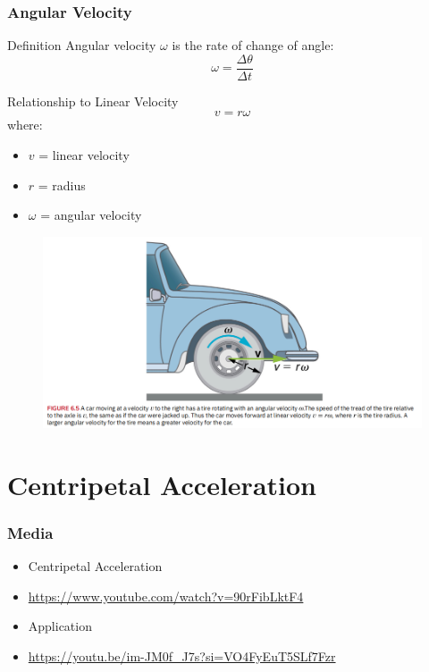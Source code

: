 \documentclass{beamer}
\begin{document}
\begin{frame}
\frametitle{Angular Velocity}
\begin{block}{Definition}
Angular velocity $\omega$ is the rate of change of angle:
\[ \omega = \frac{\Delta\theta}{\Delta t} \]
\end{block}
\begin{block}{Relationship to Linear Velocity}
\[ v = r\omega \]
where:
\begin{itemize}
\item $v$ = linear velocity
\item $r$ = radius
\item $\omega$ = angular velocity
\end{itemize}
\end{block}
\end{frame}

\begin{frame}
\begin{figure}
    \centering
    \includegraphics[width=1\linewidth]{CH6/wheelomega.png}
\end{figure}
\end{frame}

\section{Centripetal Acceleration}

\begin{frame}
\frametitle{Media}
     \begin{itemize}
  \item Centripetal Acceleration
  \item \hyperlink{https://www.youtube.com/watch?v=90rFibLktF4}{https://www.youtube.com/watch?v=90rFibLktF4}
  \item Application
  \item \hyperlink{https://youtu.be/im-JM0f_J7s?si=VO4FyEuT5SLf7Fzr}{https://youtu.be/im-JM0f_J7s?si=VO4FyEuT5SLf7Fzr}
  \end{itemize}
\end{frame}
\end{document}
